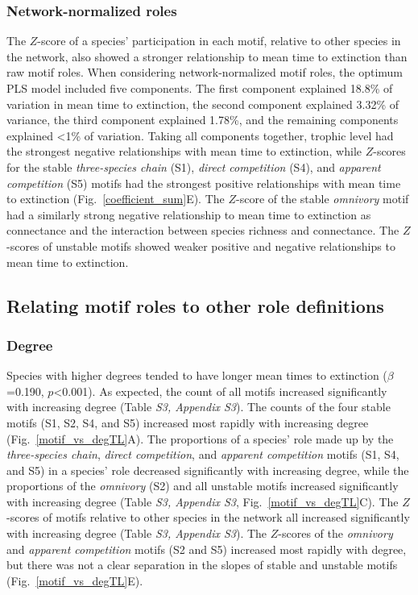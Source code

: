 \documentclass[12pt]{article}
\begin{document}
\begin{spacing}{2.0}
        \subsubsection*{Network-normalized roles}
        
    		The $Z$-score of a species' participation in each motif, relative to other species in the network, also showed a stronger relationship to mean time to extinction than raw motif roles.
    		When considering network-normalized motif roles, the optimum PLS model included five components.
    		The first component explained 18.8\% of variation in mean time to extinction, the second component explained 3.32\% of variance, the third component explained 1.78\%, and the remaining components explained \textless1\% of variation.
    		Taking all components together, trophic level had the strongest negative relationships  with mean time to extinction, while $Z$-scores for the stable \emph{three-species chain} (S1), \emph{direct competition} (S4), and \emph{apparent competition} (S5) motifs had the strongest positive relationships with mean time to extinction (Fig.~\ref{coefficient_sum}E). 
    		The $Z$-score of the stable \emph{omnivory} motif had a similarly strong negative relationship to mean time to extinction as connectance and the interaction between species richness and connectance.
    		The $Z$-scores of unstable motifs showed weaker positive and negative relationships to mean time to extinction.
    		

	\subsection*{Relating motif roles to other role definitions}

        \subsubsection*{Degree}
        
            Species with higher degrees tended to have longer mean times to extinction ($\beta$=0.190, $p$\textless0.001).
    		As expected, the count of all motifs increased significantly with increasing degree (Table \emph{S3, Appendix S3}).
    		The counts of the four stable motifs (S1, S2, S4, and S5) increased most rapidly with increasing degree (Fig.~\ref{motif_vs_degTL}A).
    		The proportions of a species' role made up by the \emph{three-species chain}, \emph{direct competition}, and \emph{apparent competition} motifs (S1, S4, and S5) in a species' role decreased significantly with increasing degree, while the proportions of the \emph{omnivory} (S2) and all unstable motifs increased significantly with increasing degree (Table \emph{S3, Appendix S3}, Fig.~\ref{motif_vs_degTL}C).
    		The $Z$-scores of motifs relative to other species in the network all increased significantly with increasing degree (Table \emph{S3, Appendix S3}).
            The $Z$-scores of the \emph{omnivory} and \emph{apparent competition} motifs (S2 and S5) increased most rapidly with degree, but there was not a clear separation in the slopes of stable and unstable motifs (Fig.~\ref{motif_vs_degTL}E).



\end{spacing}
\end{document}
